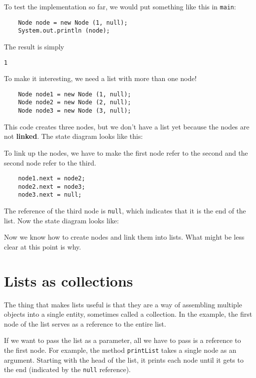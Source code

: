 To test the implementation so far, we would put something like
this in {\tt main}:

\begin{verbatim}
    Node node = new Node (1, null);
    System.out.println (node);
\end{verbatim}
%
The result is simply

\begin{verbatim}
1
\end{verbatim}
%
To make it interesting, we need a list with more than
one node!

\begin{verbatim}
    Node node1 = new Node (1, null);
    Node node2 = new Node (2, null);
    Node node3 = new Node (3, null);
\end{verbatim}
%
This code creates three nodes, but we don't have a list yet
because the nodes are not {\bf linked}.  The state diagram
looks like this:




To link up the nodes, we have to make the first node refer to the
second and the second node refer to the third.

\begin{verbatim}
    node1.next = node2;
    node2.next = node3;
    node3.next = null;
\end{verbatim}
%
The reference of the third node is {\tt null}, which indicates that
it is the end of the list.  Now the state diagram looks like:




Now we know how to create nodes and link them into lists.  What
might be less clear at this point is why.

\section{Lists as collections}

The thing that makes lists useful is that they are a way of assembling
multiple objects into a single entity, sometimes called a collection.
In the example, the first node of the list serves as a reference to
the entire list.


If we want to pass the list as a parameter, all we have to pass is a
reference to the first node.  For example, the method {\tt printList}
takes a single node as an argument.  Starting with the head of the
list, it prints each node until it gets to the end (indicated by the
{\tt null} reference).

